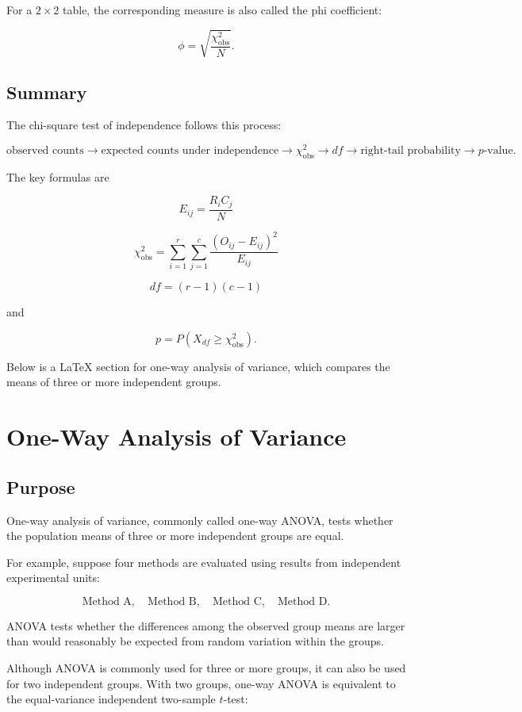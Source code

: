 \documentclass[11pt]{article}
\begin{document}
For a \(2\times2\) table, the corresponding measure is also called the
phi coefficient:

\[
\phi=\sqrt{\frac{\chi^2_{\mathrm{obs}}}{N}}.
\]

\subsection{Summary}

The chi-square test of independence follows this process:

\[
\boxed{
\text{observed counts}
\rightarrow
\text{expected counts under independence}
\rightarrow
\chi^2_{\mathrm{obs}}
\rightarrow
df
\rightarrow
\text{right-tail probability}
\rightarrow
p\text{-value}.
}
\]

The key formulas are

\[
\boxed{
E_{ij}
=
\frac{R_iC_j}{N}
}
\]

\[
\boxed{
\chi^2_{\mathrm{obs}}
=
\sum_{i=1}^{r}
\sum_{j=1}^{c}
\frac{(O_{ij}-E_{ij})^2}{E_{ij}}
}
\]

\[
\boxed{
df=(r-1)(c-1)
}
\]

and

\[
\boxed{
p=P\left(
X_{df}\geq\chi^2_{\mathrm{obs}}
\right).
}
\]

Below is a LaTeX section for one-way analysis of variance, which compares the means of three or more independent groups.

\section{One-Way Analysis of Variance}

\subsection{Purpose}

One-way analysis of variance, commonly called one-way ANOVA, tests
whether the population means of three or more independent groups are
equal.

For example, suppose four methods are evaluated using results from
independent experimental units:

\[
\text{Method A},\quad
\text{Method B},\quad
\text{Method C},\quad
\text{Method D}.
\]

ANOVA tests whether the differences among the observed group means are
larger than would reasonably be expected from random variation within
the groups.

Although ANOVA is commonly used for three or more groups, it can also be
used for two independent groups. With two groups, one-way ANOVA is
equivalent to the equal-variance independent two-sample \(t\)-test:
\end{document}
